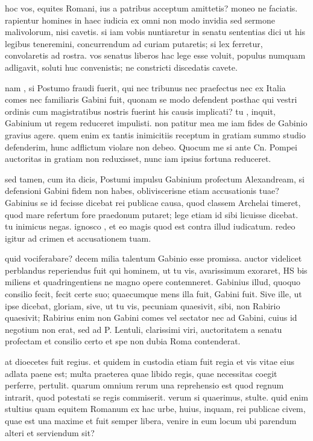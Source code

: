  hoc vos, equites Romani, ius a patribus acceptum amittetis? moneo ne faciatis. rapientur homines in haec iudicia ex omni non modo invidia sed sermone malivolorum, nisi cavetis. si iam vobis nuntiaretur in senatu sententias dici ut his legibus teneremini, concurrendum ad curiam putaretis; si lex ferretur, convolaretis ad rostra. vos senatus liberos hac lege esse voluit, populus numquam adligavit, soluti huc convenistis; ne constricti discedatis cavete.

 nam , si Postumo fraudi fuerit, qui nec tribunus nec praefectus nec ex Italia comes nec familiaris Gabini fuit, quonam se modo defendent posthac qui vestri ordinis cum magistratibus nostris fuerint his causis implicati? tu , inquit, Gabinium ut regem reduceret impulisti. non patitur mea me iam fides de Gabinio gravius agere. quem enim ex tantis inimicitiis receptum in gratiam summo studio defenderim, hunc adflictum violare non debeo. Quocum me si ante Cn. Pompei auctoritas in gratiam non reduxisset, nunc iam ipsius fortuna reduceret.

 sed tamen, cum ita dicis, Postumi impulsu Gabinium profectum Alexandream, si defensioni Gabini fidem non habes, obliviscerisne etiam accusationis tuae? Gabinius se id fecisse dicebat rei publicae causa, quod classem Archelai timeret, quod mare refertum fore praedonum putaret; lege etiam id sibi licuisse dicebat. tu inimicus negas. ignosco , et eo magis quod est contra illud iudicatum. redeo igitur ad crimen et accusationem tuam.

 quid vociferabare? decem milia talentum Gabinio esse promissa. auctor videlicet perblandus reperiendus fuit qui hominem, ut tu vis, avarissimum exoraret, HS bis miliens et quadringentiens ne magno opere contemneret. Gabinius illud, quoquo consilio fecit, fecit certe suo; quaecumque mens illa fuit, Gabini fuit. Sive ille, ut ipse dicebat, gloriam, sive, ut tu vis, pecuniam quaesivit, sibi, non Rabirio quaesivit; Rabirius enim non Gabini comes vel sectator nec ad Gabini, cuius id negotium non erat, sed ad P. Lentuli, clarissimi viri, auctoritatem a senatu profectam et consilio certo et spe non dubia Roma contenderat.

 at dioecetes fuit regius. et quidem in custodia etiam fuit regia et vis vitae eius adlata paene est; multa praeterea quae libido regis, quae necessitas coegit perferre, pertulit. quarum omnium rerum una reprehensio est quod regnum intrarit, quod potestati se regis commiserit. verum si quaerimus, stulte. quid enim stultius quam equitem Romanum ex hac urbe, huius, inquam, rei publicae civem, quae est una maxime et fuit semper libera, venire in eum locum ubi parendum alteri et serviendum sit?

